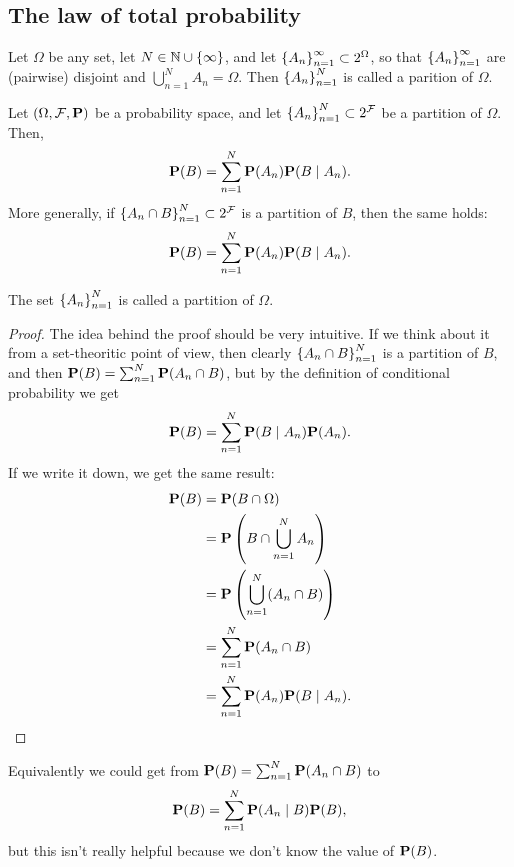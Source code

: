 \documentclass[11pt,a4paper]{article}
\begin{document}
\subsection{The law of total probability}

\begin{definition}[Partition]
  Let $\Omega$ be any set, let $N \in \mathbb{N} \cup \left\{\infty\right\}$,
  and let $\left\{A_n\right\}_{n=1}^{\infty} \subset 2^{\Omega}$,
  so that $\left\{A_n\right\}_{n=1}^{\infty}$ are (pairwise) disjoint and
  $\bigcup_{n=1}^{N} A_n = \Omega$.
  Then $\left\{A_n\right\}_{n=1}^{N}$ is called a parition of $\Omega$.
\end{definition}

\begin{proposition}
  Let $(\Omega, \mathcal F, \mathbf{P})$ be a probability space,
  and let $\left\{A_n\right\}_{n=1}^{N} \subset 2^{\mathcal F}$
  be a partition of $\Omega$.
  Then,
  \[
    \mathbf{P}(B) = \sum_{n=1}^{N} \mathbf{P}(A_n) \mathbf{P}(B \mid A_n).
  \]
  More generally, if $\left\{A_n \cap B\right\}_{n=1}^{N} \subset 2^{\mathcal F}$
  is a partition of $B$, then the same holds:
  \[
    \mathbf{P}(B) = \sum_{n=1}^{N} \mathbf{P}(A_n) \mathbf{P}(B \mid A_n).
  \]
\end{proposition}
\begin{remark}
  The set $\left\{A_n\right\}_{n=1}^{N}$ is called a partition of $\Omega$.
\end{remark}
\begin{proof}
  The idea behind the proof should be very intuitive.
  If we think about it from a set-theoritic point of view,
  then clearly $\left\{A_n \cap B\right\}_{n=1}^{N}$ is a partition of $B$,
  and then $\mathbf{P}(B) = \sum_{n=1}^{N} \mathbf{P}(A_n \cap B)$,
  but by the definition of conditional probability we get
  \[
    \mathbf{P}(B) = \sum_{n=1}^{N} \mathbf{P}(B \mid A_n) \mathbf{P}(A_n).
  \]
  If we write it down, we get the same result:
  \begin{align*}
    \mathbf{P}(B) &= 
    \mathbf{P}(B \cap \Omega) \\ &= 
    \mathbf{P}\left( B \cap \bigcup_{n=1}^{N} A_n \right) \\ &= 
    \mathbf{P}\left( \bigcup_{n=1}^{N} (A_n \cap B) \right) \\ &= 
    \sum_{n=1}^{N} \mathbf{P}(A_n \cap B) \\ &= 
    \sum_{n=1}^{N} \mathbf{P}(A_n) \mathbf{P}(B \mid A_n).
    \end{align*}
\end{proof}
\begin{remark}
  Equivalently we could get from $\mathbf{P}(B) = \sum_{n=1}^{N} \mathbf{P}(A_n \cap B)$
  to
  \[
    \mathbf{P}(B) = \sum_{n=1}^{N} \mathbf{P}(A_n \mid B) \mathbf{P}(B),
  \]
  but this isn't really helpful because we don't know the value of $\mathbf{P}(B)$.
\end{remark}
\end{document}
